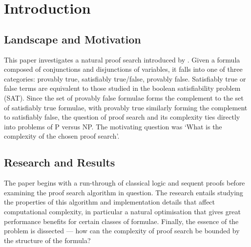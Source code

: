 \chapter{Introduction}
    
    \section*{Landscape and Motivation}
        This paper investigates a natural proof search introduced by \citet{petri-nets}.
        Given a formula composed of conjunctions and disjunctions of variables, it falls into one of three categories: provably true, satisfiably true/false, provably false.
        Satisfiably true or false terms are equivalent to those studied in the boolean satisfiability problem (SAT).
        Since the set of provably false formulae forms the complement to the set of satisfiably true formulae, with provably true similarly forming the complement to satisfiably false, the question of proof search and its complexity ties directly into problems of P versus NP\@.
        The motivating question was `What is the complexity of the chosen proof search'.
   
    \section*{Research and Results}
        The paper begins with a run-through of classical logic and sequent proofs before examining the proof search algorithm in question.
        The research entails studying the properties of this algorithm and implementation details that affect computational complexity, in particular a natural optimisation that gives great performance benefits for certain classes of formulae.
        Finally, the essence of the problem is dissected --- how can the complexity of proof search be bounded by the structure of the formula?
    
